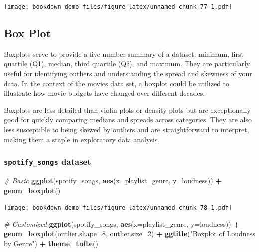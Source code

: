 \documentclass[
  b5paper]{book}
\newenvironment{Shaded}{\begin{snugshade}}{\end{snugshade}}
\newcommand{\AttributeTok}[1]{\textcolor[rgb]{0.13,0.29,0.53}{#1}}
\newcommand{\CommentTok}[1]{\textcolor[rgb]{0.56,0.35,0.01}{\textit{#1}}}
\newcommand{\DecValTok}[1]{\textcolor[rgb]{0.00,0.00,0.81}{#1}}
\newcommand{\FunctionTok}[1]{\textcolor[rgb]{0.13,0.29,0.53}{\textbf{#1}}}
\newcommand{\NormalTok}[1]{#1}
\newcommand{\SpecialCharTok}[1]{\textcolor[rgb]{0.81,0.36,0.00}{\textbf{#1}}}
\newcommand{\StringTok}[1]{\textcolor[rgb]{0.31,0.60,0.02}{#1}}
\begin{document}
\texttt{[image: bookdown-demo\_files/figure-latex/unnamed-chunk-77-1.pdf]}

\hypertarget{box-plot}{%
\subsection*{Box Plot}\label{box-plot}}

Boxplots serve to provide a five-number summary of a dataset: minimum, first quartile (Q1), median, third quartile (Q3), and maximum. They are particularly useful for identifying outliers and understanding the spread and skewness of your data. In the context of the movies data set, a boxplot could be utilized to illustrate how movie budgets have changed over different decades.

Boxplots are less detailed than violin plots or density plots but are exceptionally good for quickly comparing medians and spreads across categories. They are also less susceptible to being skewed by outliers and are straightforward to interpret, making them a staple in exploratory data analysis.

\hypertarget{spotify_songs-dataset-2}{%
\subsubsection*{\texorpdfstring{\texttt{spotify\_songs} dataset}{spotify\_songs dataset}}\label{spotify_songs-dataset-2}}

\begin{Shaded}
\begin{Highlighting}[]
\CommentTok{\# Basic}
\FunctionTok{ggplot}\NormalTok{(spotify\_songs, }\FunctionTok{aes}\NormalTok{(}\AttributeTok{x=}\NormalTok{playlist\_genre, }\AttributeTok{y=}\NormalTok{loudness)) }\SpecialCharTok{+} \FunctionTok{geom\_boxplot}\NormalTok{()}
\end{Highlighting}
\end{Shaded}

\texttt{[image: bookdown-demo\_files/figure-latex/unnamed-chunk-78-1.pdf]}

\begin{Shaded}
\begin{Highlighting}[]
\CommentTok{\# Customized}
\FunctionTok{ggplot}\NormalTok{(spotify\_songs, }\FunctionTok{aes}\NormalTok{(}\AttributeTok{x=}\NormalTok{playlist\_genre, }\AttributeTok{y=}\NormalTok{loudness)) }\SpecialCharTok{+}
  \FunctionTok{geom\_boxplot}\NormalTok{(}\AttributeTok{outlier.shape=}\DecValTok{8}\NormalTok{, }\AttributeTok{outlier.size=}\DecValTok{2}\NormalTok{) }\SpecialCharTok{+}
  \FunctionTok{ggtitle}\NormalTok{(}\StringTok{"Boxplot of Loudness by Genre"}\NormalTok{) }\SpecialCharTok{+}
  \FunctionTok{theme\_tufte}\NormalTok{()}
\end{Highlighting}
\end{Shaded}
\end{document}
